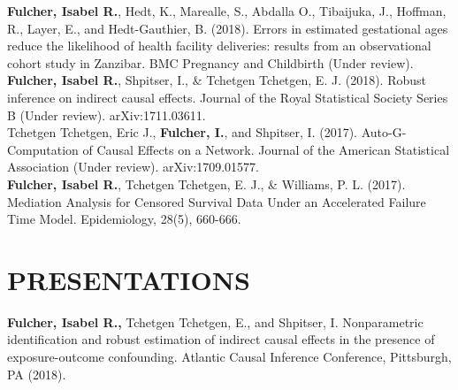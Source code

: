 \documentclass[12pt]{article}
\begin{document}








\textbf{Fulcher, Isabel R.}, Hedt, K., Marealle, S., Abdalla O., Tibaijuka, J., Hoffman, R., Layer, E., and Hedt-Gauthier, B. (2018). Errors in estimated gestational ages reduce the likelihood of health facility deliveries: results from an observational cohort study in Zanzibar. BMC Pregnancy and Childbirth (Under review). \\

\textbf{Fulcher, Isabel R.}, Shpitser, I., \& Tchetgen Tchetgen, E. J. (2018). Robust inference on indirect causal effects. Journal of the Royal Statistical Society Series B (Under review). arXiv:1711.03611. \\

Tchetgen Tchetgen, Eric J., \textbf{Fulcher, I.}, and Shpitser, I. (2017). Auto-G-Computation of Causal Effects on a Network. Journal of the American Statistical Association (Under review). arXiv:1709.01577. \\

\textbf{Fulcher, Isabel R.}, Tchetgen Tchetgen, E. J., \& Williams, P. L. (2017). Mediation Analysis for Censored Survival Data Under an Accelerated Failure Time Model. Epidemiology, 28(5), 660-666. 

\section*{\textbf{{\large P}{RESENTATIONS}}}

\textbf{Fulcher, Isabel R.,} Tchetgen Tchetgen, E., and Shpitser, I. Nonparametric identification and robust estimation of indirect causal effects in the presence of exposure-outcome confounding. Atlantic Causal Inference Conference, Pittsburgh, PA (2018). \\
\end{document}
